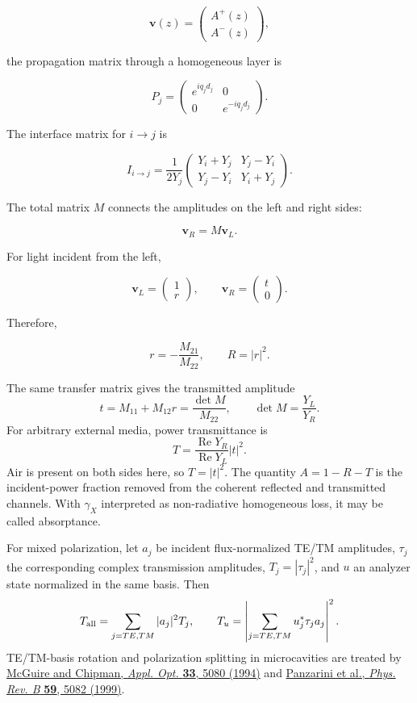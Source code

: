 \documentclass[12pt,a4paper]{article}
\begin{document}
\[
\mathbf v(z)=
\begin{pmatrix}
A^+(z)\\
A^-(z)
\end{pmatrix},
\]

the propagation matrix through a homogeneous layer is

\[
P_j=
\begin{pmatrix}
e^{iq_jd_j} & 0\\
0 & e^{-iq_jd_j}
\end{pmatrix}.
\]

The interface matrix for $i\rightarrow j$ is

\[
I_{i\rightarrow j}
=
\frac{1}{2Y_j}
\begin{pmatrix}
Y_i+Y_j & Y_j-Y_i\\
Y_j-Y_i & Y_i+Y_j
\end{pmatrix}.
\]

The total matrix $M$ connects the amplitudes on the left and right sides:

\[
\mathbf v_R=M\mathbf v_L.
\]

For light incident from the left,

\[
\mathbf v_L=
\begin{pmatrix}
1\\
r
\end{pmatrix},
\qquad
\mathbf v_R=
\begin{pmatrix}
t\\
0
\end{pmatrix}.
\]

Therefore,

\[
r=-\frac{M_{21}}{M_{22}},
\qquad
R=|r|^2.
\]

The same transfer matrix gives the transmitted amplitude
\[
t=M_{11}+M_{12}r=\frac{\det M}{M_{22}},
\qquad \det M=\frac{Y_L}{Y_R}.
\]
For arbitrary external media, power transmittance is
\[
T=\frac{\operatorname{Re}Y_R}{\operatorname{Re}Y_L}|t|^2.
\]
Air is present on both sides here, so $T=|t|^2$. The quantity $A=1-R-T$
is the incident-power fraction removed from the coherent reflected and
transmitted channels. With $\gamma_X$ interpreted as non-radiative
homogeneous loss, it may be called absorptance.

For mixed polarization, let $a_j$ be incident flux-normalized TE/TM
amplitudes, $\tau_j$ the corresponding complex transmission amplitudes,
$T_j=|\tau_j|^2$, and $u$ an analyzer state normalized in the same basis.
Then
\[
T_{\rm all}=\sum_{j=TE,TM}|a_j|^2T_j,\qquad
T_u=\left|\sum_{j=TE,TM}u_j^*\tau_j a_j\right|^2.
\]
TE/TM-basis rotation and polarization splitting in microcavities are
treated by \href{https://doi.org/10.1364/AO.33.005080}{McGuire and Chipman,
\textit{Appl. Opt.} \textbf{33}, 5080 (1994)} and
\href{https://doi.org/10.1103/PhysRevB.59.5082}{Panzarini et al.,
\textit{Phys. Rev. B} \textbf{59}, 5082 (1999)}.
\end{document}
